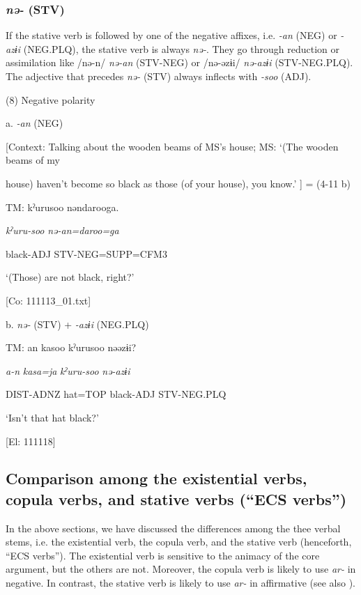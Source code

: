 \subsubsection{\textit{nə-} (STV)}

If the stative verb is followed by one of the negative affixes, i.e. \textit{{}-an} (NEG) or \textit{{}-azɨi} (NEG.PLQ), the stative verb is always \textit{nə-}. They go through reduction or assimilation like /nə-n/ \textit{nə-an} (STV-NEG) or /nə-əzɨi/ \textit{nə-azɨi} (STV-NEG.PLQ). The adjective that precedes \textit{nə-} (STV) always inflects with \textit{{}-soo} (ADJ).

(8)  Negative polarity

  a.  \textit{{}-an} (NEG)

    [Context: Talking about the wooden beams of MS’s house; MS: ‘(The wooden beams of my

house) haven’t become so black as those (of your house), you know.’ ] = (4-11 b)

    TM:  kˀurusoo  nəndarooga.

      \textit{kˀuru-soo}  \textit{nə-an=daroo=ga}

      black-ADJ  STV-NEG=SUPP=CFM3

      ‘(Those) are not black, right?’

      [Co: 111113\_01.txt]

  b.  \textit{nə-} (STV) + \textit{{}-azɨi} (NEG.PLQ)

    TM:  an  kasoo  kˀurusoo  nəəzɨi?

      \textit{a-n}  \textit{kasa=ja}  \textit{kˀuru-soo}  \textit{nə-azɨi}

      DIST-ADNZ  hat=TOP  black-ADJ  STV-NEG.PLQ

      ‘Isn’t that hat black?’

      [El: 111118]

\subsection{Comparison among the existential verbs, copula verbs, and stative verbs (“ECS verbs”)}

In the above sections, we have discussed the differences among the thee verbal stems, i.e. the existential verb, the copula verb, and the stative verb (henceforth, “ECS verbs”). The existential verb is sensitive to the animacy of the core argument, but the others are not. Moreover, the copula verb is likely to use \textit{ar-} in negative. In contrast, the stative verb is likely to use \textit{ar-} in affirmative (see also ).

